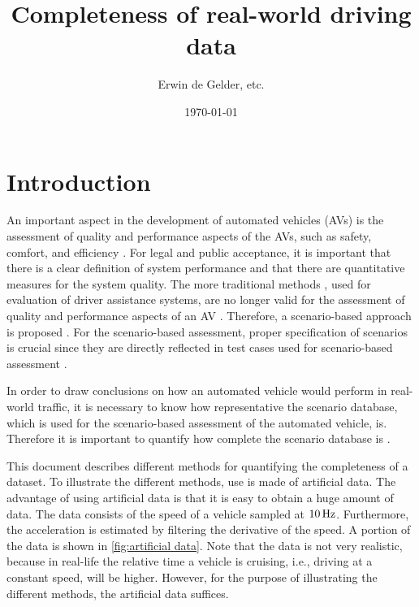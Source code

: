 \documentclass[10pt,final,a4paper,oneside,onecolumn]{article}
\def\reptitle{Completeness of real-world driving data}
\def\repauthor{Erwin de Gelder, etc.}
\theoremstyle{plain}\newtheorem{definition}{Definition}[section]    %
\theoremstyle{definition}\newtheorem{example}{Example}[section]     %
\theoremstyle{remark}\newtheorem{remarkenv}{Remark}[section]        %
\begin{document}

\title{\textbf{\reptitle}}
\author{\repauthor}
\date{\today}
\maketitle

\tableofcontents

\newpage

\section{Introduction}
\label{sec:introduction}

An important aspect in the development of automated vehicles (AVs) is the assessment of quality and performance aspects of the AVs, such as safety, comfort, and efficiency \cite{bengler2014threedecades, stellet2015taxonomy, wachenfeld2016release, putz2017pegasus, roesener2016scenariobased, kompass2015sicherheitsveranderung}. 
For legal and public acceptance, it is important that there is a clear definition of system performance and that there are quantitative measures for the system quality. 
The more traditional methods \cite{response2006code, ISO26262}, used for evaluation of driver assistance systems, are no longer valid for the assessment of quality and performance aspects of an AV \cite{wachenfeld2016release}. 
Therefore, a scenario-based approach is proposed \cite{roesener2016scenariobased, putz2017pegasus, kompass2015sicherheitsveranderung}. 
For the scenario-based assessment, proper specification of scenarios is crucial since they are directly reflected in test cases used for scenario-based assessment \cite{stellet2015taxonomy}.

In order to draw conclusions on how an automated vehicle would perform in real-world traffic, it is necessary to know how representative the scenario database, which is used for the scenario-based assessment of the automated vehicle, is. Therefore it is important to quantify how complete the scenario database is \cite{geyer2014, alvarez2017prospective, stellet2015taxonomy}.

This document describes different methods for quantifying the completeness of a dataset. To illustrate the different methods, use is made of artificial data. The advantage of using artificial data is that it is easy to obtain a huge amount of data. The data consists of the speed of a vehicle sampled at $\unit[10]{Hz}$. Furthermore, the acceleration is estimated by filtering the derivative of the speed. A portion of the data is shown in \cref{fig:artificial data}. Note that the data is not very realistic, because in real-life the relative time a vehicle is cruising, i.e., driving at a constant speed, will be higher. However, for the purpose of illustrating the different methods, the artificial data suffices.
\end{document}
